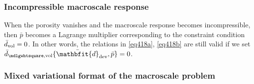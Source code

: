 \documentclass[10pt,a4paper]{article}
\renewcommand{\ts}[1]{\mathbfit{#1}}
\renewcommand{\Box}{\mdlgwhtsquare}
\begin{document}
\subsubsection{Incompressible macroscale response}

When the porosity vanishes and the macroscale response becomes incompressible, then $\bar{p}$ becomes a Lagrange multiplier corresponding to the constraint condition $\bar{d}_{\mathrm{vol}} = 0$. In other words, the relations in \eqref{eq418a}, \eqref{eq418b} are still valid if we set $\bar{d}_{\Box,\vol}\{\bar{\ts d}_\dev,\bar p\} = 0$.

\subsubsection{Mixed variational format of the macroscale problem}
\end{document}
